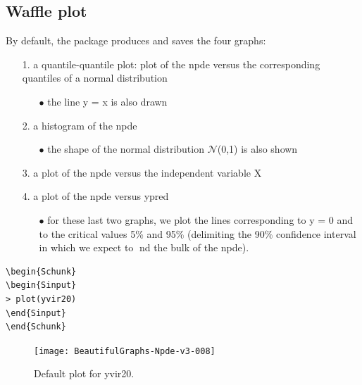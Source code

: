 \documentclass{report}
\begin{document}
\subsection{Waffle plot}
By default, the package produces and saves the four graphs:

\begin{itemize}
\item[1.] a quantile-quantile plot: plot of the npde versus the corresponding quantiles of a normal distribution
\begin{itemize}
\item[$\bullet$] the line y = x is also drawn
\end{itemize}
\item[2.] a histogram of the npde
\begin{itemize}
\item[$\bullet$] the shape of the normal distribution $\mathcal{N}$(0,1) is also shown
\end{itemize}
\item[3.] a plot of the npde versus the independent variable X
\item[4.] a plot of the npde versus ypred
\begin{itemize}
\item[$\bullet$]  for these last two graphs, we plot the lines corresponding to y = 0 and to the critical values
5\% and 95\% (delimiting the 90\% confidence interval in which we expect to nd the bulk of
the npde).
\end{itemize}
\end{itemize}

\begin{lstlisting}[linerange=\\begin\{Sinput\}-\\end\{Sinput\}, includerangemarker=false]
\begin{Schunk}
\begin{Sinput}
> plot(yvir20)
\end{Sinput}
\end{Schunk}
\end{lstlisting}


\begin{figure}[H]
\caption{Default plot for yvir20.}
\label{fig:plotByDefault}
\centering
\texttt{[image: BeautifulGraphs-Npde-v3-008]}
\end{figure}
\end{document}
